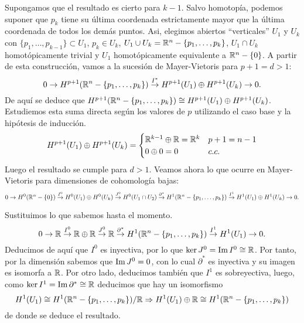 \documentclass[twoside]{article}
\begin{document}
\begin{solucion}
Supongamos que el resultado es cierto para $k-1$. Salvo homotopía, podemos suponer que $p_k$ tiene su última coordenada estrictamente mayor que la última coordenada de todos los demás puntos. Asi, elegimos abiertos ``verticales'' $U_1$ y $U_k$ con $\{p_1,\dots, p_{k-1}\}\subset U_1$, $p_k\in U_k$, $U_1\cup U_k=\mathbb{R}^n-\{p_1,\dots, p_k\}$, $U_1\cap U_k$ homotópicamente trivial y $U_1$ homotópicamente equivalente a $\mathbb{R}^n-\{0\}$. A partir de esta construcción, vamos a la sucesión de Mayer-Vietoris para $p+1=d>1$:
\[
0\to H^{p+1}(\mathbb{R}^n-\{p_1,\dots, p_k\})\overset{I^*}{\to} H^{p+1}(U_1)\oplus H^{p+1}(U_k)\to 0.
\]
De aquí se deduce que $H^{p+1}(\mathbb{R}^n-\{p_1,\dots, p_k\})\cong H^{p+1}(U_1)\oplus H^{p+1}(U_k)$. Estudiemos esta suma directa según los valores de $p$ utilizando el caso base y la hipótesis de inducción. 
\[
 H^{p+1}(U_1)\oplus H^{p+1}(U_k)=\begin{cases}
\mathbb{R}^{k-1}\oplus \mathbb{R}=\mathbb{R}^k & p+1=n-1\\
0\oplus 0= 0 & c.c.
 \end{cases}
\]
Luego el resultado se cumple para $d>1$. Veamos ahora lo que ocurre en Mayer-Vietoris para dimensiones de cohomología bajas:
\[
0\to H^0(\mathbb{R}^n-\{0\})\overset{I^0}{\to}H^0(U_1)\oplus H^0(U_k)\overset{J^0}{\to}H^0(U_1\cap U_2)\overset{\partial^*}{\to} H^{1}(\mathbb{R}^n-\{p_1,\dots, p_k\})\overset{I^1}{\to} H^{1}(U_1)\oplus H^{1}(U_k)\to 0.
\]

Sustituimos lo que sabemos hasta el momento. 
\[
0\to \mathbb{R}\overset{I^0}{\to}\mathbb{R}\oplus \mathbb{R}\overset{J^0}{\to}\mathbb{R}\overset{\partial^*}{\to} H^{1}(\mathbb{R}^n-\{p_1,\dots, p_k\})\overset{I^1}{\to} H^{1}(U_1) \to 0.
\]
Deducimos de aquí que $I^0$ es inyectiva, por lo que $\ker{J^0}=\operatorname{Im}{I^0}\cong\mathbb{R}$. Por tanto, por la dimensión sabemos que $\operatorname{Im}{J^0}=0$, con lo cual $\partial^*$ es inyectiva y su imagen es isomorfa a $\mathbb{R}$. Por otro lado, deducimos también que $I^1$ es sobreyectiva, luego, como $\ker{I^1}=\operatorname{Im}{\partial^*}\cong\mathbb{R}$ deducimos que hay un isomorfismo
\[
  H^{1}(U_1) \cong  H^{1}(\mathbb{R}^n-\{p_1,\dots, p_k\})/\mathbb{R}\Rightarrow H^{1}(U_1)\oplus\mathbb{R}\cong  H^{1}(\mathbb{R}^n-\{p_1,\dots, p_k\})
\]
de donde se deduce el resultado.

\end{solucion}
\newpage
\end{document}
